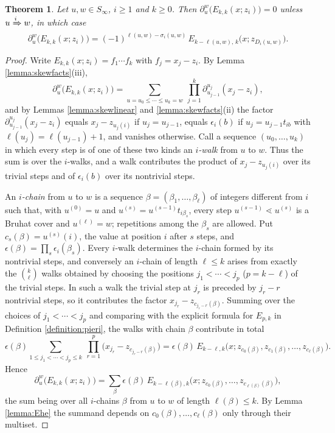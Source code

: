 \documentclass{amsart}
\newtheorem{theorem}[lemma]{Theorem}
\theoremstyle{definition}
\theoremstyle{remark}
\numberwithin{equation}{section}
\begin{document}
\begin{theorem} \label{theorem:skewtop}
Let $u,w\in S_\infty$, $i\geq1$ and $k\geq0$. Then $\partial^w_u\big(E_{k,k}(x;z_i)\big)=0$ unless $u\xRightarrow{i}w$, in which case
$$\partial^w_u\big(E_{k,k}(x;z_i)\big)=(-1)^{\ell(u,w)-\sigma_i(u,w)}\,E_{k-\ell(u,w),\,k}\big(x;z_{D_i(u,w)}\big).$$
\end{theorem}
\begin{proof}
Write $E_{k,k}(x;z_i)=f_1\cdots f_k$ with $f_j=x_j-z_i$. By Lemma \ref{lemma:skewfacts}(iii),
$$\partial^w_u\big(E_{k,k}(x;z_i)\big)=\sum_{u=u_0\leq\cdots\leq u_k=w}\ \prod_{j=1}^k\partial^{u_j}_{u_{j-1}}(x_j-z_i),$$
and by Lemmas \ref{lemma:skewlinear} and \ref{lemma:skewfacts}(ii) the factor $\partial^{u_j}_{u_{j-1}}(x_j-z_i)$ equals $x_j-z_{u_j(i)}$ if $u_j=u_{j-1}$, equals $\epsilon_i(b)$ if $u_j=u_{j-1}t_{ib}$ with $\ell(u_j)=\ell(u_{j-1})+1$, and vanishes otherwise. Call a sequence $(u_0,\ldots,u_k)$ in which every step is of one of these two kinds an \emph{$i$-walk} from $u$ to $w$. Thus the sum is over the $i$-walks, and a walk contributes the product of $x_j-z_{u_j(i)}$ over its trivial steps and of $\epsilon_i(b)$ over its nontrivial steps.

An \emph{$i$-chain} from $u$ to $w$ is a sequence $\beta=(\beta_1,\ldots,\beta_\ell)$ of integers different from $i$ such that, with $u^{(0)}=u$ and $u^{(s)}=u^{(s-1)}t_{i\beta_s}$, every step $u^{(s-1)}\lessdot u^{(s)}$ is a Bruhat cover and $u^{(\ell)}=w$; repetitions among the $\beta_s$ are allowed. Put $c_s(\beta)=u^{(s)}(i)$, the value at position $i$ after $s$ steps, and $\epsilon(\beta)=\prod_s\epsilon_i(\beta_s)$. Every $i$-walk determines the $i$-chain formed by its nontrivial steps, and conversely an $i$-chain of length $\ell\leq k$ arises from exactly the $\binom{k}{\ell}$ walks obtained by choosing the positions $j_1<\cdots<j_p$ ($p=k-\ell$) of the trivial steps. In such a walk the trivial step at $j_r$ is preceded by $j_r-r$ nontrivial steps, so it contributes the factor $x_{j_r}-z_{c_{j_r-r}(\beta)}$. Summing over the choices of $j_1<\cdots<j_p$ and comparing with the explicit formula for $E_{p,k}$ in Definition \ref{definition:pieri}, the walks with chain $\beta$ contribute in total
$$\epsilon(\beta)\sum_{1\leq j_1<\cdots<j_p\leq k}\ \prod_{r=1}^p\big(x_{j_r}-z_{c_{j_r-r}(\beta)}\big)=\epsilon(\beta)\,E_{k-\ell,k}\big(x;z_{c_0(\beta)},z_{c_1(\beta)},\ldots,z_{c_\ell(\beta)}\big).$$
Hence
\begin{equation}\label{eq:chainsum}
\partial^w_u\big(E_{k,k}(x;z_i)\big)=\sum_{\beta}\epsilon(\beta)\,E_{k-\ell(\beta),k}\big(x;z_{c_0(\beta)},\ldots,z_{c_{\ell(\beta)}(\beta)}\big),
\end{equation}
the sum being over all $i$-chains $\beta$ from $u$ to $w$ of length $\ell(\beta)\leq k$. By Lemma \ref{lemma:Ehe} the summand depends on $c_0(\beta),\ldots,c_\ell(\beta)$ only through their multiset.


\end{proof}
\end{document}

